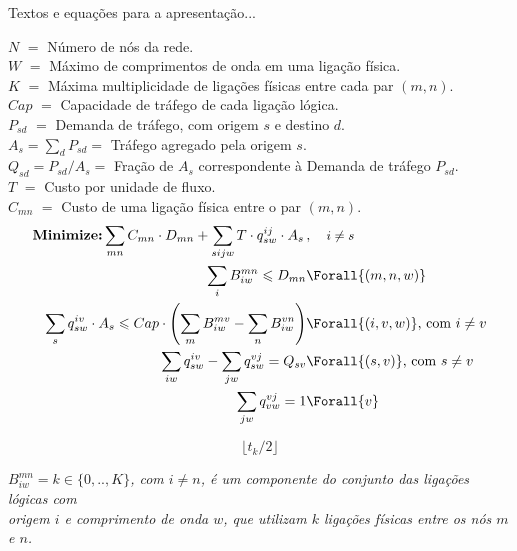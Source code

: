 

Textos e equa\c c\~oes para a apresenta\c c\~ao...

 \noindent$N$ $=$ N\'umero de n\'os da rede.\\
 $W$ $=$ M\'aximo de comprimentos de onda em uma liga\c c\~ao f\'isica.\\
 $K$ $=$ M\'axima multiplicidade de liga\c c\~oes f\'isicas entre cada par $(m,n)$.\\
 
\noindent $Cap$ $=$ Capacidade de tr\'afego de cada liga\c c\~ao l\'ogica.\\
 $P_{sd}$ $=$ Demanda de tr\'afego, com origem $s$ e destino $d$.\\
 $A_s = \sum_d P_{sd} =$ Tr\'afego agregado pela origem $s$. \\
 $Q_{sd}=P_{sd}/A_s =$ Fra\c c\~ao de $A_s$ correspondente \`a Demanda de tr\'afego $P_{sd}$.\\

  \noindent$T$ $=$ Custo por unidade de fluxo.\\
  $C_{mn}$ $=$ Custo de uma liga\c c\~ao f\'isica entre o par $(m,n)$.\\
 

$$
\begin{aligned}
\mbox{\textbf{Minimize:}}\sum_{mn} C_{mn}\cdot D_{mn} + \sum_{sijw} T\cdot q_{sw}^{ij}\cdot A_s \,&,\quad \mbox{\small$i\neq s$}\\
\sum_i B_{iw}^{mn} \leqslant D_{mn} &\Forall{(m,n,w)}\\
\sum_{s} q_{sw}^{iv}\cdot A_s \leqslant Cap\cdot \left(\sum_{m} B_{iw}^{mv} - \sum_{n} B_{iw}^{vn}\right) &\Forall{(i,v,w)} \mbox{, com $i\neq v$}\\
\sum_{iw} q_{sw}^{iv} - \sum_{jw} q_{sw}^{vj} = Q_{sv} &\Forall{(s,v)} \mbox{, com $s\neq v$}\\
\sum_{jw} q_{vw}^{vj} = 1 &\Forall{v} 
\end{aligned}
$$

$$\lfloor t_k/2\rfloor$$

{\noindent \begin{flushright}\emph{
     $B_{iw}^{mn} = k\in \{0,..,K\}$, com $i\neq n$, \'e um componente do conjunto das liga\c c\~oes l\'ogicas com \\
     origem $i$ e comprimento de onda $w$, que utilizam $k$ liga\c c\~oes f\'isicas entre os n\'os $m$ e $n$.
}\end{flushright}}
 
